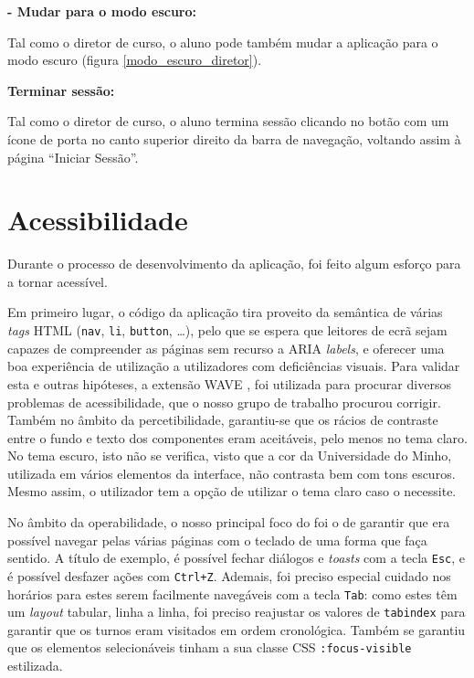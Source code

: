\documentclass[12pt, a4paper]{article}
\begin{document}
\textbf{- Mudar para o modo escuro:}

Tal como o diretor de curso, o aluno pode também mudar a aplicação para o modo escuro (figura
\ref{modo_escuro_diretor}).

\textbf{Terminar sessão:}

Tal como o diretor de curso, o aluno termina sessão clicando no botão com um ícone de porta no
canto superior direito da barra de navegação, voltando assim à página ``Iniciar Sessão''.

\section{Acessibilidade}

Durante o processo de desenvolvimento da aplicação, foi feito algum esforço para a tornar acessível.

Em primeiro lugar, o código da aplicação tira proveito da semântica de várias \emph{tags} HTML
(\texttt{nav}, \texttt{li}, \texttt{button}, \ldots), pelo que se espera que leitores de ecrã sejam
capazes de compreender as páginas sem recurso a ARIA \emph{labels}, e oferecer uma boa experiência
de utilização a utilizadores com deficiências visuais. Para validar esta e outras hipóteses, a
extensão WAVE \cite{wave}, foi utilizada para procurar diversos problemas de acessibilidade, que o
nosso grupo de trabalho procurou corrigir. Também no âmbito da percetibilidade, garantiu-se que os
rácios de contraste entre o fundo e texto dos componentes eram aceitáveis, pelo menos no tema claro.
No tema escuro, isto não se verifica, visto que a cor da Universidade do Minho, utilizada em vários
elementos da interface, não contrasta bem com tons escuros. Mesmo assim, o utilizador tem a opção de
utilizar o tema claro caso o necessite.

No âmbito da operabilidade, o nosso principal foco do foi o de garantir que era possível navegar
pelas várias páginas com o teclado de uma forma que faça sentido. A título de exemplo, é possível
fechar diálogos e \emph{toasts} com a tecla \texttt{Esc}, e é possível desfazer ações com
\texttt{Ctrl+Z}. Ademais, foi preciso especial cuidado nos horários para estes serem facilmente
navegáveis com a tecla \texttt{Tab}: como estes têm um \emph{layout} tabular, linha a linha, foi
preciso reajustar os valores de \texttt{tabindex} para garantir que os turnos eram visitados em
ordem cronológica. Também se garantiu que os elementos selecionáveis tinham a sua classe CSS
\texttt{:focus-visible} estilizada.
\end{document}
